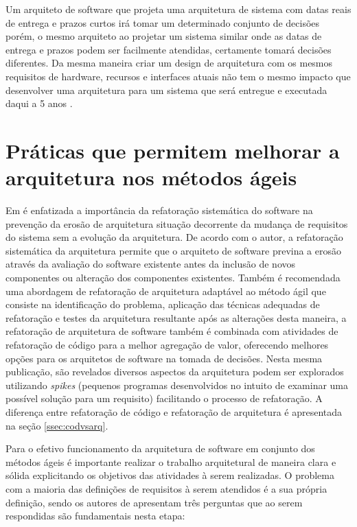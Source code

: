 Um arquiteto de software que projeta uma arquitetura de sistema com datas reais de entrega e prazos curtos irá tomar um determinado conjunto de decisões porém, o mesmo arquiteto ao projetar um sistema similar onde as datas de entrega e prazos podem ser facilmente atendidas, certamente tomará decisões diferentes. Da mesma maneira criar um design de arquitetura com os mesmos requisitos de hardware, recursos e interfaces atuais não tem o mesmo impacto que desenvolver uma arquitetura para um sistema que será entregue e executada daqui a 5 anos \cite{bass2007software}.

\section{Práticas que permitem melhorar a arquitetura nos métodos ágeis}

Em \cite{babar2013agile} é enfatizada a importância da refatoração sistemática do software na prevenção da erosão de arquitetura situação decorrente da mudança de requisitos do sistema sem a evolução da arquitetura. De acordo com o autor, a refatoração sistemática da arquitetura  permite que o arquiteto de software previna a erosão através da avaliação do software existente antes da inclusão de novos componentes ou alteração dos componentes existentes. Também é recomendada uma abordagem de refatoração de arquitetura adaptável ao método ágil que consiste na identificação do problema, aplicação das técnicas adequadas de refatoração e testes da arquitetura resultante após as alterações desta maneira, a refatoração de arquitetura de software também é combinada com atividades de refatoração de código para a melhor agregação de valor, oferecendo melhores opções para os arquitetos de software na tomada de decisões. Nesta mesma publicação, são revelados diversos aspectos da arquitetura podem ser explorados utilizando \textit{spikes} (pequenos programas desenvolvidos no intuito de examinar uma possível solução para um requisito) facilitando o processo de refatoração. A diferença entre refatoração de código e refatoração de arquitetura é apresentada na seção \ref{ssec:codvsarq}.

Para o efetivo funcionamento da arquitetura de software em conjunto dos métodos ágeis é importante realizar o trabalho arquitetural de maneira clara e sólida explicitando os objetivos das atividades à serem realizadas. O problema com a maioria das definições de requisitos à serem atendidos é a sua própria definição, sendo os autores de \cite{babar2013agile} apresentam três perguntas que ao serem respondidas são fundamentais nesta etapa:

